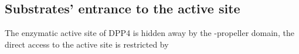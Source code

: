 \subsection{Substrates' entrance to the active site}

The enzymatic active site of DPP4 is hidden away by the \beta-propeller domain, the direct access to the active site is restricted by 